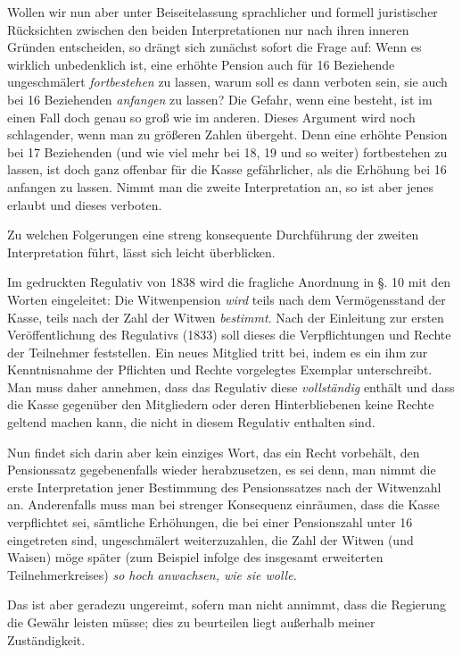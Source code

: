 Wollen wir nun aber unter Beiseitelassung sprachlicher und formell juristischer Rücksichten zwischen den beiden Interpretationen nur nach ihren inneren Gründen entscheiden, so drängt sich zunächst sofort die Frage auf: Wenn es wirklich unbedenklich ist, eine erhöhte Pension auch für 16 Beziehende ungeschmälert \textit{fortbestehen} zu lassen, warum soll es dann verboten sein, sie auch bei 16 Beziehenden \textit{anfangen} zu lassen? Die Gefahr, wenn eine besteht, ist im einen Fall doch genau so groß wie im anderen. Dieses Argument wird noch schlagender, wenn man zu größeren Zahlen übergeht. Denn eine erhöhte Pension bei 17 Beziehenden (und wie viel mehr bei 18, 19 und so weiter) fortbestehen zu lassen, ist doch ganz offenbar für die Kasse gefährlicher, als die Erhöhung bei 16 anfangen zu lassen. Nimmt man die zweite Interpretation an, so ist aber jenes erlaubt und dieses verboten.

Zu welchen Folgerungen eine streng konsequente Durchführung der zweiten Interpretation führt, lässt sich leicht überblicken.

Im gedruckten Regulativ von 1838 wird die fragliche Anordnung in §. 10 mit den Worten eingeleitet: Die Witwenpension \textit{wird} teils nach dem Vermögensstand der Kasse, teils nach der Zahl der Witwen \textit{bestimmt}. Nach der Einleitung zur ersten Veröffentlichung des Regulativs (1833) soll dieses die Verpflichtungen und Rechte der Teilnehmer feststellen. Ein neues Mitglied tritt bei, indem es ein ihm zur Kenntnisnahme der Pflichten und Rechte vorgelegtes Exemplar unterschreibt. Man muss daher annehmen, dass das Regulativ diese \textit{vollständig} enthält und dass die Kasse gegenüber den Mitgliedern oder deren Hinterbliebenen keine Rechte geltend machen kann, die nicht in diesem Regulativ enthalten sind.

Nun findet sich darin aber kein einziges Wort, das ein Recht vorbehält, den Pensionssatz gegebenenfalls wieder herabzusetzen, es sei denn, man nimmt die erste Interpretation jener Bestimmung des Pensionssatzes nach der Witwenzahl an. Anderenfalls muss man bei strenger Konsequenz einräumen, dass die Kasse verpflichtet sei, sämtliche Erhöhungen, die bei einer Pensionszahl unter 16 eingetreten sind, ungeschmälert weiterzuzahlen, die Zahl der Witwen (und Waisen) möge später (zum Beispiel infolge des insgesamt erweiterten Teilnehmerkreises) \textit{so hoch anwachsen, wie sie wolle.}

Das ist aber geradezu ungereimt, sofern man nicht annimmt, dass die Regierung die Gewähr leisten müsse; dies zu beurteilen liegt außerhalb meiner Zuständigkeit.

